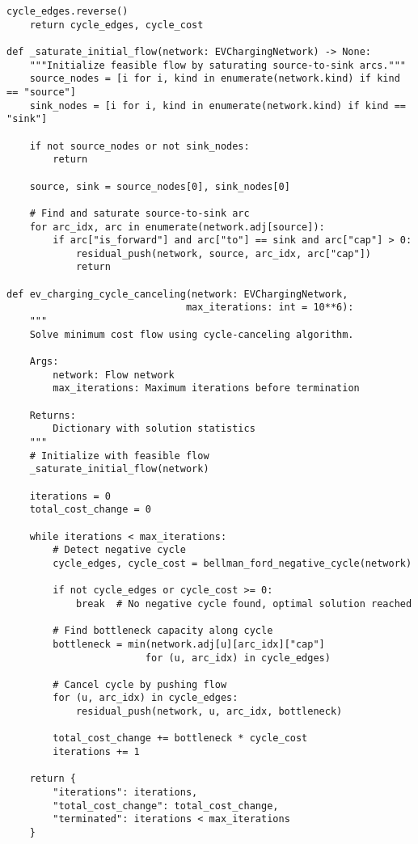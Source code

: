 \documentclass[12pt,a4paper]{article}
\begin{document}
\begin{lstlisting}[caption=Cycle-Canceling with Bellman-Ford]
    cycle_edges.reverse()
    return cycle_edges, cycle_cost

def _saturate_initial_flow(network: EVChargingNetwork) -> None:
    """Initialize feasible flow by saturating source-to-sink arcs."""
    source_nodes = [i for i, kind in enumerate(network.kind) if kind == "source"]
    sink_nodes = [i for i, kind in enumerate(network.kind) if kind == "sink"]
    
    if not source_nodes or not sink_nodes:
        return
    
    source, sink = source_nodes[0], sink_nodes[0]
    
    # Find and saturate source-to-sink arc
    for arc_idx, arc in enumerate(network.adj[source]):
        if arc["is_forward"] and arc["to"] == sink and arc["cap"] > 0:
            residual_push(network, source, arc_idx, arc["cap"])
            return

def ev_charging_cycle_canceling(network: EVChargingNetwork, 
                               max_iterations: int = 10**6):
    """
    Solve minimum cost flow using cycle-canceling algorithm.
    
    Args:
        network: Flow network
        max_iterations: Maximum iterations before termination
    
    Returns:
        Dictionary with solution statistics
    """
    # Initialize with feasible flow
    _saturate_initial_flow(network)
    
    iterations = 0
    total_cost_change = 0
    
    while iterations < max_iterations:
        # Detect negative cycle
        cycle_edges, cycle_cost = bellman_ford_negative_cycle(network)
        
        if not cycle_edges or cycle_cost >= 0:
            break  # No negative cycle found, optimal solution reached
        
        # Find bottleneck capacity along cycle
        bottleneck = min(network.adj[u][arc_idx]["cap"] 
                        for (u, arc_idx) in cycle_edges)
        
        # Cancel cycle by pushing flow
        for (u, arc_idx) in cycle_edges:
            residual_push(network, u, arc_idx, bottleneck)
        
        total_cost_change += bottleneck * cycle_cost
        iterations += 1
    
    return {
        "iterations": iterations,
        "total_cost_change": total_cost_change,
        "terminated": iterations < max_iterations
    }
\end{lstlisting}
\end{document}
